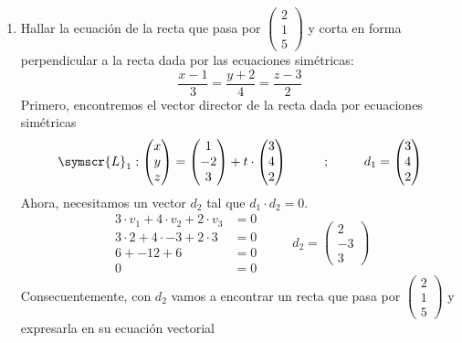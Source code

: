 \documentclass{article}
\def\fancyL{\symscr{L}}
\begin{document}
\begin{enumerate}
\item Hallar la ecuación de la recta que pasa por \(\left(\begin{smallmatrix}2 \\ 1 \\ 5\end{smallmatrix}\right)\) y corta en forma perpendicular a la recta dada por las ecuaciones simétricas:
    \[
        \frac{x - 1}{3} = \frac{y + 2}{4} = \frac{z - 3}{2}
    \]
    Primero, encontremos el vector director de la recta dada por ecuaciones simétricas
    \[
        \fancyL_1 : 
        \begin{pmatrix}
            x \\ y \\ z
        \end{pmatrix} =
        \begin{pmatrix}
            1 \\ -2 \\ 3
        \end{pmatrix}
        + 
        t \cdot
        \begin{pmatrix}
            3 \\ 4 \\ 2
        \end{pmatrix}
        \hspace{1cm}
        \text{;}
        \hspace{1cm}
        d_1 = 
        \begin{pmatrix}
            3 \\ 4 \\ 2
        \end{pmatrix}
    \]
    Ahora, necesitamos un vector \(d_2\) tal que \(d_1 \cdot d_2 = 0\).
    \[
        \begin{aligned}
            3 \cdot v_1 + 4 \cdot v_2 + 2 \cdot v_3 &= 0 \\
            3 \cdot 2 + 4 \cdot -3 + 2 \cdot 3 &= 0 \\
            6 + -12 + 6 &= 0 \\ 
            0 &= 0
        \end{aligned}
        \hspace{1cm}
        d_2 =
        \begin{pmatrix}
            2 \\ -3 \\ 3
        \end{pmatrix}
    \]
    Consecuentemente, con \(d_2\) vamos a encontrar un recta que pasa por \(\begin{pmatrix}2 \\ 1 \\ 5\end{pmatrix}\) y expresarla en su ecuación vectorial

\end{enumerate}
\end{document}
